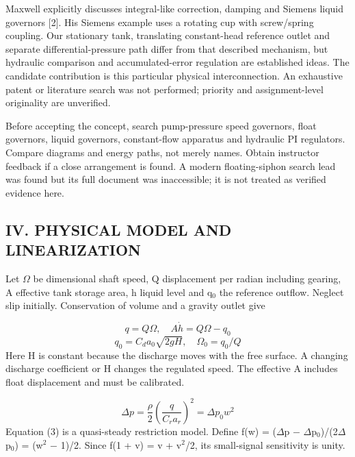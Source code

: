 \documentclass[conference]{IEEEtran}
\begin{document}
Maxwell explicitly discusses integral-like correction, damping and Siemens liquid governors [2]. His Siemens example uses a rotating cup with screw/spring coupling. Our stationary tank, translating constant-head reference outlet and separate differential-pressure path differ from that described mechanism, but hydraulic comparison and accumulated-error regulation are established ideas. The candidate contribution is this particular physical interconnection. An exhaustive patent or literature search was not performed; priority and assignment-level originality are unverified.

Before accepting the concept, search pump-pressure speed governors, float governors, liquid governors, constant-flow apparatus and hydraulic PI regulators. Compare diagrams and energy paths, not merely names. Obtain instructor feedback if a close arrangement is found. A modern floating-siphon search lead was found but its full document was inaccessible; it is not treated as verified evidence here.

\subsection*{IV. PHYSICAL MODEL AND LINEARIZATION}
Let \ensuremath{\Omega} be dimensional shaft speed, Q displacement per radian including gearing, A effective tank storage area, h liquid level and q\ensuremath{{}_0} the reference outflow. Neglect slip initially. Conservation of volume and a gravity outlet give

\begin{equation}q=Q\Omega,\quad A\dot h=Q\Omega-q_0\end{equation}
\begin{equation}q_0=C_d a_0\sqrt{2gH},\quad \Omega_0=q_0/Q\end{equation}
Here H is constant because the discharge moves with the free surface. A changing discharge coefficient or H changes the regulated speed. The effective A includes float displacement and must be calibrated.

\begin{equation}\Delta p=\frac{\rho}{2}\left(\frac{q}{C_r a_r}\right)^2=\Delta p_0w^2\end{equation}
Equation (3) is a quasi-steady restriction model. Define f(w) = (\ensuremath{\Delta}p \ensuremath{-} \ensuremath{\Delta}p\ensuremath{{}_0})/(2\ensuremath{\Delta}p\ensuremath{{}_0}) = (w\ensuremath{{}^2} \ensuremath{-} 1)/2. Since f(1 + v) = v + v\ensuremath{{}^2}/2, its small-signal sensitivity is unity.
\end{document}
